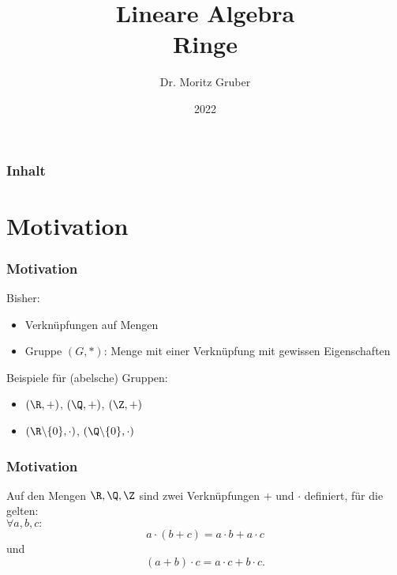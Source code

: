 


\title{Lineare Algebra\\[3mm] 
	\large Ringe
}
\author{Dr. Moritz Gruber } 
\date{2022}



%
\begin{frame}[plain] 
 \titlepage
\end{frame}
%
%
\begin{frame}\frametitle{Inhalt}
   \tableofcontents
\end{frame}
%
\section{Motivation}
%
\begin{frame}\frametitle{Motivation}
	
	Bisher:
	\begin{itemize}
		\item Verkn\"upfungen auf Mengen
		\item Gruppe $(G,\ast)$: Menge mit einer Verkn\"upfung mit gewissen Eigenschaften 
	\end{itemize}
	\vfill
	Beispiele f\"ur (abelsche) Gruppen:
	\begin{itemize}
		\item $(\R, +)$, $(\Q,+)$, $(\Z,+)$
		\item $(\R\backslash\{0\},\cdot)$, $(\Q\backslash\{0\},\cdot)$ 
	\end{itemize}
	
	
\end{frame}
%
%
\begin{frame}\frametitle{Motivation}
	
	Auf den Mengen $\R, \Q, \Z$ sind zwei Verkn\"upfungen $+$ und $\cdot$ definiert, f\"ur die  gelten:\\\vfill
	$\forall a,b,c: $
	$$
		a\cdot (b+c) = a\cdot b + a\cdot c
	$$
	und
	$$
		 (a+b)\cdot c = a\cdot c + b\cdot c.
	$$
	
\end{frame}
%
